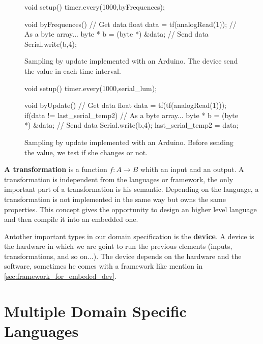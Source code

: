 \begin{figure}[ht]
  \centering
\begin{scalacode}
void setup(){
  timer.every(1000,byFrequences);
}

void byFrequences(){
  // Get data
  float data = tf(analogRead(1));
  // As a byte array...
  byte * b = (byte *) &data;
  // Send data
  Serial.write(b,4);
}
\end{scalacode}
  \caption[Sampling by frequences implemented with an Arduino]{Sampling by update
    implemented with an Arduino. The device send the value in each time interval.}
  \label{lst:arduino_sampling_update}
\end{figure}

\begin{figure}[ht]
  \centering
\begin{scalacode}
void setup(){
  timer.every(1000,serial_lum);
}

void byUpdate(){
  // Get data
  float data = tf(tf(analogRead(1)));
  if(data != last_serial_temp2) {
    // As a byte array...
    byte * b = (byte *) &data;
    // Send data
    Serial.write(b,4);
  }
  last_serial_temp2 = data;
}
\end{scalacode}
  \caption[Sampling by update implemented with an Arduino]{Sampling by update
    implemented with an Arduino. Before sending the value, we test if she
    changes or not.}
  \label{lst:arduino_sampling_frequences}
\end{figure}

\textbf{A transformation} is a function $f : A \rightarrow B$ whith an input
and an output. A transformation is independent from the languages or framework,
the only important part of a transformation is his semantic. Depending on the
language, a transformation is not implemented in the same way but owns the same
properties. This concept gives the opportunity to design an higher level
language and then compile it into an embedded one.

Antother important types in our domain specification is the \textbf{device}. A
device is the hardware in which we are goint to run the previous elements
(inputs, transformations, and so on...). The device depends on the hardware and
the software, sometimes he comes with a framework like mention
in \ref{sec:framework_for_embeded_dev}.

\section{Multiple Domain Specific Languages}
\label{sec:multiple_dsl}

